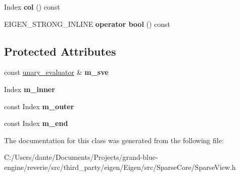\begin{DoxyCompactItemize}
\mbox{\label{class_eigen_1_1internal_1_1unary__evaluator_3_01_sparse_view_3_01_arg_type_01_4_00_01_index_based_01_4_1_1_inner_iterator_a6b9a064954baa2edbecaa1d21f6a17e0}} 
Index {\bfseries col} () const
\item 
\mbox{\label{class_eigen_1_1internal_1_1unary__evaluator_3_01_sparse_view_3_01_arg_type_01_4_00_01_index_based_01_4_1_1_inner_iterator_a96176507389cffd59f94a823a4cf8b8c}} 
E\+I\+G\+E\+N\+\_\+\+S\+T\+R\+O\+N\+G\+\_\+\+I\+N\+L\+I\+NE {\bfseries operator bool} () const
\end{DoxyCompactItemize}
\subsection*{Protected Attributes}
\begin{DoxyCompactItemize}
\item 
\mbox{\label{class_eigen_1_1internal_1_1unary__evaluator_3_01_sparse_view_3_01_arg_type_01_4_00_01_index_based_01_4_1_1_inner_iterator_a5708af517973b9d60eba6c9c8c5a4dbf}} 
const \mbox{\hyperlink{struct_eigen_1_1internal_1_1unary__evaluator}{unary\+\_\+evaluator}} \& {\bfseries m\+\_\+sve}
\item 
\mbox{\label{class_eigen_1_1internal_1_1unary__evaluator_3_01_sparse_view_3_01_arg_type_01_4_00_01_index_based_01_4_1_1_inner_iterator_a265b0b50cf0ca876d6e85a5a5c2b9ae0}} 
Index {\bfseries m\+\_\+inner}
\item 
\mbox{\label{class_eigen_1_1internal_1_1unary__evaluator_3_01_sparse_view_3_01_arg_type_01_4_00_01_index_based_01_4_1_1_inner_iterator_a64a63c33d13620c822ae35b014e8a086}} 
const Index {\bfseries m\+\_\+outer}
\item 
\mbox{\label{class_eigen_1_1internal_1_1unary__evaluator_3_01_sparse_view_3_01_arg_type_01_4_00_01_index_based_01_4_1_1_inner_iterator_abb528e0d3fc6c3c26e1354caf77bf99f}} 
const Index {\bfseries m\+\_\+end}
\end{DoxyCompactItemize}


The documentation for this class was generated from the following file\+:\begin{DoxyCompactItemize}
\item 
C\+:/\+Users/dante/\+Documents/\+Projects/grand-\/blue-\/engine/reverie/src/third\+\_\+party/eigen/\+Eigen/src/\+Sparse\+Core/Sparse\+View.\+h\end{DoxyCompactItemize}
